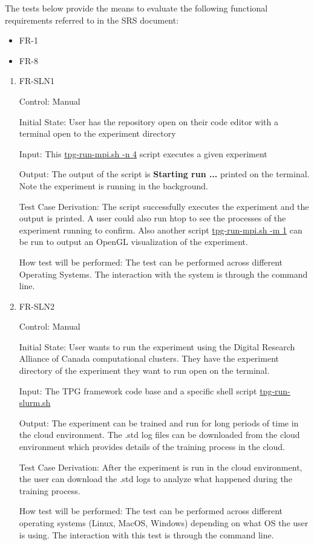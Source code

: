 \documentclass[12pt, titlepage]{article}
\begin{document}
The tests below provide the means to evaluate the following functional requirements referred to in the SRS document:
\begin{itemize}
  \item FR-1
  \item FR-8
\end{itemize}

\begin{enumerate}

\item{FR-SLN1}

Control: Manual
					
Initial State: User has the repository open on their code editor with a terminal open to the experiment directory
					
Input: This \href{https://github.com/TPGEngine/tpg/blob/main/src/scripts/run/tpg-run-mpi.sh}{tpg-run-mpi.sh -n 4} script executes a given experiment
					
Output: The output of the script is \textbf{Starting run ...} printed on the terminal. Note the experiment is running in the background.

Test Case Derivation: The script successfully executes the experiment and the output is printed. A user could also run htop to see the processes of the experiment running to confirm. Also another script \href{https://github.com/TPGEngine/tpg/blob/main/src/scripts/run/tpg-run-mpi.sh}{tpg-run-mpi.sh -m 1} can be run to output an OpenGL visualization of the experiment. 

How test will be performed: The test can be performed across different Operating Systems. The interaction with the system is through the command line.
					
\item{FR-SLN2}

Control: Manual
					
Initial State: User wants to run the experiment using the Digital Research Alliance of Canada computational clusters. They have the experiment directory of the experiment they want to run open on the terminal.
					
Input: The TPG framework code base and a specific shell script \href{https://github.com/TPGEngine/tpg/blob/main/src/scripts/run/tpg-run-slurm.sh}{tpg-run-slurm.sh}
					
Output: The experiment can be trained and run for long periods of time in the cloud environment. The .std log files can be downloaded from the cloud environment which provides details of the training process in the cloud.

Test Case Derivation: After the experiment is run in the cloud environment, the user can download the .std logs to analyze what happened during the training process.

How test will be performed: The test can be performed across different operating systems (Linux, MacOS, Windows) depending on what OS the user is using. The interaction with this test is through the command line.

\end{enumerate}
\end{document}

